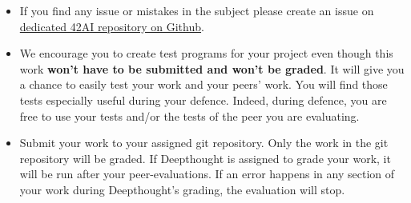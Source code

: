 \begin{itemize}
  \item If you find any issue or mistakes in the subject please create an issue on \href{https://github.com/42-AI/bootcamp_python/issues}{dedicated 42AI repository on Github}.  
  
  \item We encourage you to create test programs for your
  project even though this work \textbf{won't have to be
  submitted and won't be graded}. It will give you a chance
  to easily test your work and your peers’ work. You will find
  those tests especially useful during your defence. Indeed,
  during defence, you are free to use your tests and/or the
  tests of the peer you are evaluating.
  
  \item Submit your work to your assigned git repository. Only the work in the
  git repository will be graded. If Deepthought is assigned to grade your
  work, it will be run after your peer-evaluations.
  If an error happens in any section of your work during Deepthought's grading,
  the evaluation will stop.
\end{itemize} 